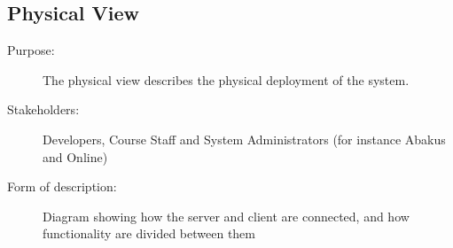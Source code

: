 \subsection{Physical View}
\begin{description}
  \item[Purpose:]{The physical view describes the physical deployment of the
    system.}
  \item[Stakeholders:]{Developers, Course Staff and System Administrators (for
    instance Abakus and Online)}
  \item[Form of description:]{Diagram showing how the server and client are
    connected, and how functionality are divided between them}
\end{description}
